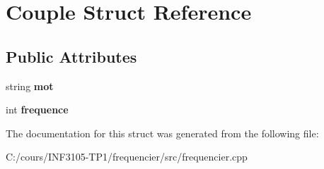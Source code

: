 \hypertarget{struct_couple}{}\section{Couple Struct Reference}
\label{struct_couple}
\subsection*{Public Attributes}
\begin{DoxyCompactItemize}
\item 
\hypertarget{struct_couple_a96d6885f158ca7cb74ab30035e13a79e}{}string {\bfseries mot}\label{struct_couple_a96d6885f158ca7cb74ab30035e13a79e}

\item 
\hypertarget{struct_couple_a230f654557fdbdba4d0ba15ecde6ba41}{}int {\bfseries frequence}\label{struct_couple_a230f654557fdbdba4d0ba15ecde6ba41}

\end{DoxyCompactItemize}


The documentation for this struct was generated from the following file\+:\begin{DoxyCompactItemize}
\item 
C\+:/cours/\+I\+N\+F3105-\/\+T\+P1/frequencier/src/frequencier.\+cpp\end{DoxyCompactItemize}
